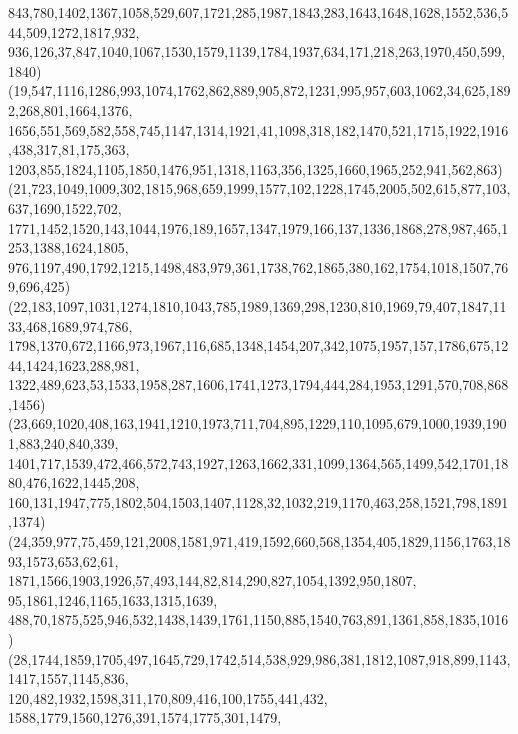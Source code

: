 \documentclass[a4paper,twopage,reqno,12pt]{amsart}
\theoremstyle{definition}
\numberwithin{equation}{section}
\begin{document}
\begin{enumerate}
{{843,780,1402,1367,1058,529,607,1721,285,1987,1843,283,1643,1648,1628,1552,536,544,509,1272,1817,932,\\
936,126,37,847,1040,1067,1530,1579,1139,1784,1937,634,171,218,263,1970,450,599,1840)\\
(19,547,1116,1286,993,1074,1762,862,889,905,872,1231,995,957,603,1062,34,625,1892,268,801,1664,1376,\\
1656,551,569,582,558,745,1147,1314,1921,41,1098,318,182,1470,521,1715,1922,1916,438,317,81,175,363,\\
1203,855,1824,1105,1850,1476,951,1318,1163,356,1325,1660,1965,252,941,562,863)\\
(21,723,1049,1009,302,1815,968,659,1999,1577,102,1228,1745,2005,502,615,877,103,637,1690,1522,702,\\
1771,1452,1520,143,1044,1976,189,1657,1347,1979,166,137,1336,1868,278,987,465,1253,1388,1624,1805,\\
976,1197,490,1792,1215,1498,483,979,361,1738,762,1865,380,162,1754,1018,1507,769,696,425)\\
(22,183,1097,1031,1274,1810,1043,785,1989,1369,298,1230,810,1969,79,407,1847,1133,468,1689,974,786,\\
1798,1370,672,1166,973,1967,116,685,1348,1454,207,342,1075,1957,157,1786,675,1244,1424,1623,288,981,\\
1322,489,623,53,1533,1958,287,1606,1741,1273,1794,444,284,1953,1291,570,708,868,1456)\\
(23,669,1020,408,163,1941,1210,1973,711,704,895,1229,110,1095,679,1000,1939,1901,883,240,840,339,\\
1401,717,1539,472,466,572,743,1927,1263,1662,331,1099,1364,565,1499,542,1701,1880,476,1622,1445,208,\\
160,131,1947,775,1802,504,1503,1407,1128,32,1032,219,1170,463,258,1521,798,1891,1374)\\
(24,359,977,75,459,121,2008,1581,971,419,1592,660,568,1354,405,1829,1156,1763,1893,1573,653,62,61,\\
1871,1566,1903,1926,57,493,144,82,814,290,827,1054,1392,950,1807, 95,1861,1246,1165,1633,1315,1639,\\
488,70,1875,525,946,532,1438,1439,1761,1150,885,1540,763,891,1361,858,1835,1016)\\
(28,1744,1859,1705,497,1645,729,1742,514,538,929,986,381,1812,1087,918,899,1143,1417,1557,1145,836,\\
120,482,1932,1598,311,170,809,416,100,1755,441,432,
1588,1779,1560,1276,391,1574,1775,301,1479,\\
}}
\end{enumerate}
\end{document}
